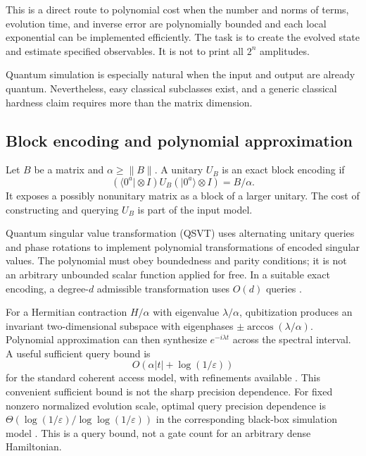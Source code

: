 \documentclass[11pt,a4paper]{article}
\newcommand{\ket}[1]{\lvert #1\rangle}
\newcommand{\bra}[1]{\langle #1\rvert}
\theoremstyle{definition}
\theoremstyle{remark}
\numberwithin{equation}{section}
\begin{document}
This is a direct route to polynomial cost when the number and norms of terms,
evolution time, and inverse error are polynomially bounded and each local
exponential can be implemented efficiently. The task is to create the
evolved state and estimate specified observables. It is not to print all
$2^n$ amplitudes.

Quantum simulation is especially natural when the input and output are
already quantum. Nevertheless, easy classical subclasses exist, and a
generic classical hardness claim requires more than the matrix dimension.

\subsection{Block encoding and polynomial approximation}
Let $B$ be a matrix and $\alpha\geq\|B\|$. A unitary $U_B$ is an exact
block encoding if
\begin{equation}\label{eq:block}
 (\bra{0^a}\otimes I)U_B(\ket{0^a}\otimes I)=B/\alpha.
\end{equation}
It exposes a possibly nonunitary matrix as a block of a larger unitary.
The cost of constructing and querying $U_B$ is part of the input model.

Quantum singular value transformation (QSVT) uses alternating unitary
queries and phase rotations to implement polynomial transformations of
encoded singular values. The polynomial must obey boundedness and parity
conditions; it is not an arbitrary unbounded scalar function applied for
free. In a suitable exact encoding, a degree-$d$ admissible transformation
uses $O(d)$ queries \citep{gilyen2019}.

For a Hermitian contraction $H/\alpha$ with eigenvalue $\lambda/\alpha$,
qubitization produces an invariant two-dimensional subspace with eigenphases
$\pm\arccos(\lambda/\alpha)$. Polynomial approximation can then synthesize
$e^{-i\lambda t}$ across the spectral interval. A useful sufficient query
bound is
\begin{equation}
 O\!\left(\alpha|t|+\log(1/\varepsilon)\right)
\end{equation}
for the standard coherent access model, with refinements available
\citep{low2019}. This convenient sufficient bound is not the sharp
precision dependence. For fixed nonzero normalized evolution scale,
optimal query precision dependence is
$\Theta(\log(1/\varepsilon)/\log\log(1/\varepsilon))$ in the
corresponding black-box simulation model \citep{low2017}. This is a query bound, not a gate count for an arbitrary
dense Hamiltonian.
\end{document}
